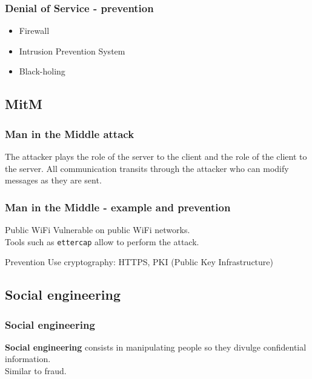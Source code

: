 \begin{frame}
\frametitle{Denial of Service - prevention}
\begin{itemize}
\item Firewall
\item Intrusion Prevention System
\item Black-holing
\end{itemize}
\end{frame}

\subsection{MitM}

\begin{frame}
\frametitle{Man in the Middle attack}
The attacker plays the role of the server to the client and the role of the
client to the server.
All communication transits through the attacker who can modify messages as
they are sent.
\end{frame}

\begin{frame}
\frametitle{Man in the Middle - example and prevention}
\begin{exampleblock}{Public WiFi}
Vulnerable on public WiFi networks.
\\ Tools such as \texttt{ettercap} allow to perform the attack.
\end{exampleblock}
\begin{block}{Prevention}
Use cryptography: HTTPS, PKI (Public Key Infrastructure)
\end{block}
\end{frame}

\subsection{Social engineering}

\begin{frame}
\frametitle{Social engineering}
\textbf{Social engineering} consists in manipulating people so they divulge
confidential information.
\\ Similar to fraud.
\pause
{}
\end{frame}

